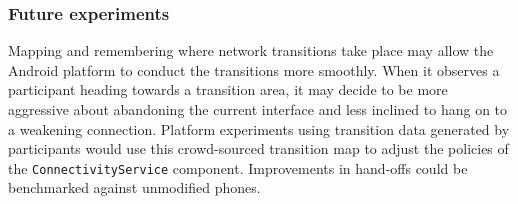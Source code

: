 \subsubsection{Future experiments}

Mapping and remembering where network transitions take place may allow the
Android platform to conduct the transitions more smoothly. When it observes a
participant heading towards a transition area, it may decide to be more
aggressive about abandoning the current interface and less inclined to hang on
to a weakening connection. Platform experiments using transition data
generated by \PhoneLab{} participants would use this crowd-sourced transition
map to adjust the policies of the \texttt{ConnectivityService} component.
Improvements in hand-offs could be benchmarked against unmodified \PhoneLab{}
phones.
